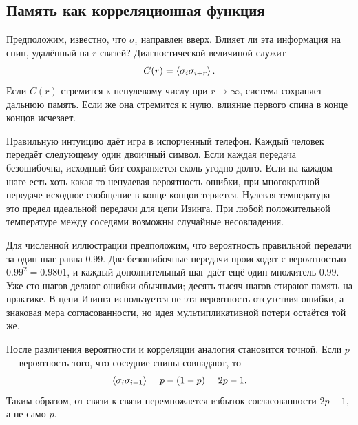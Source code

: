 \begin{classroomqa}
\end{classroomqa}

\subsection{Память как корреляционная функция}

Предположим, известно, что \(\sigma_i\) направлен вверх. Влияет ли эта информация на спин, удалённый на \(r\) связей? Диагностической величиной служит
\begin{equation}
C(r)=\left\langle\sigma_i\sigma_{i+r}\right\rangle.
\end{equation}
Если \(C(r)\) стремится к ненулевому числу при \(r\to\infty\), система сохраняет дальнюю память. Если же она стремится к нулю, влияние первого спина в конце концов исчезает.

Правильную интуицию даёт игра в испорченный телефон. Каждый человек передаёт следующему один двоичный символ. Если каждая передача безошибочна, исходный бит сохраняется сколь угодно долго. Если на каждом шаге есть хоть какая-то ненулевая вероятность ошибки, при многократной передаче исходное сообщение в конце концов теряется. Нулевая температура — это предел идеальной передачи для цепи Изинга. При любой положительной температуре между соседями возможны случайные несовпадения.

Для численной иллюстрации предположим, что вероятность правильной передачи за один шаг равна \(0.99\). Две безошибочные передачи происходят с вероятностью \(0.99^2=0.9801\), и каждый дополнительный шаг даёт ещё один множитель \(0.99\). Уже сто шагов делают ошибки обычными; десять тысяч шагов стирают память на практике. В цепи Изинга используется не эта вероятность отсутствия ошибки, а знаковая мера согласованности, но идея мультипликативной потери остаётся той же.

После различения вероятности и корреляции аналогия становится точной. Если \(p\) — вероятность того, что соседние спины совпадают, то
\begin{equation}
\left\langle\sigma_i\sigma_{i+1}\right\rangle
=p-(1-p)=2p-1.
\end{equation}
Таким образом, от связи к связи перемножается избыток согласованности \(2p-1\), а не само \(p\).


